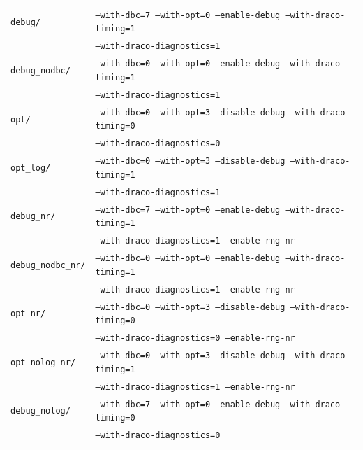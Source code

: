 \documentclass[note]{ResearchNote}
\begin{document}
\begin{center}
  \footnotesize
  \begin{tabular}{lp{4.0in}}
    \hline\hline
\texttt{debug/}  
     & \texttt{--with-dbc=7 --with-opt=0 --enable-debug --with-draco-timing=1} \\
     & \texttt{--with-draco-diagnostics=1} \\

\texttt{debug\_nodbc/}  
     & \texttt{--with-dbc=0 --with-opt=0 --enable-debug --with-draco-timing=1} \\
     & \texttt{--with-draco-diagnostics=1} \\

\texttt{opt/}  
     & \texttt{--with-dbc=0 --with-opt=3 --disable-debug --with-draco-timing=0} \\
     & \texttt{--with-draco-diagnostics=0} \\

\texttt{opt\_log/}  
     & \texttt{--with-dbc=0 --with-opt=3 --disable-debug --with-draco-timing=1} \\
     & \texttt{--with-draco-diagnostics=1} \\

\texttt{debug\_nr/}  
     & \texttt{--with-dbc=7 --with-opt=0 --enable-debug --with-draco-timing=1} \\
     & \texttt{--with-draco-diagnostics=1 --enable-rng-nr} \\

\texttt{debug\_nodbc\_nr/}  
     & \texttt{--with-dbc=0 --with-opt=0 --enable-debug --with-draco-timing=1} \\
     & \texttt{--with-draco-diagnostics=1 --enable-rng-nr} \\

\texttt{opt\_nr/}  
     & \texttt{--with-dbc=0 --with-opt=3 --disable-debug --with-draco-timing=0} \\
     & \texttt{--with-draco-diagnostics=0 --enable-rng-nr} \\

\texttt{opt\_nolog\_nr/}  
     & \texttt{--with-dbc=0 --with-opt=3 --disable-debug --with-draco-timing=1} \\
     & \texttt{--with-draco-diagnostics=1 --enable-rng-nr} \\

\texttt{debug\_nolog/}  
     & \texttt{--with-dbc=7 --with-opt=0 --enable-debug --with-draco-timing=0} \\
     & \texttt{--with-draco-diagnostics=0} \\

    \hline\hline
  \end{tabular}
\end{center}
\end{document}
